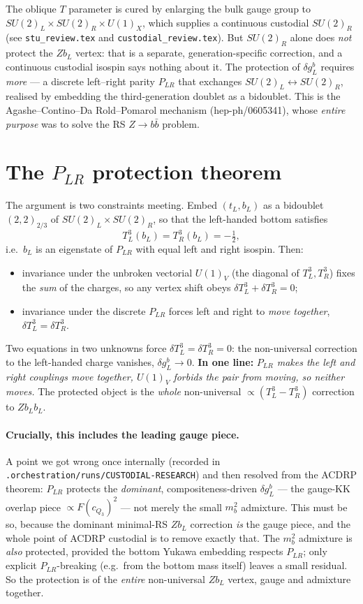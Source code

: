 \documentclass[11pt]{article}
\newcommand{\SUL}{SU(2)_L}
\newcommand{\SUR}{SU(2)_R}
\newcommand{\UX}{U(1)_X}
\newcommand{\PLR}{P_{LR}}
\newcommand{\code}[1]{\texttt{#1}}
\newcommand{\dgL}{\delta g_L^b}
\theoremstyle{definition}
\begin{document}
The oblique $T$ parameter is cured by enlarging the bulk gauge group to
$\SUL\times\SUR\times\UX$, which supplies a continuous custodial $\SUR$
(see \code{stu\_review.tex} and \code{custodial\_review.tex}). But $\SUR$ alone
does \emph{not} protect the $Zb_L$ vertex: that is a separate, generation-specific
correction, and a continuous custodial isospin says nothing about it. The
protection of $\dgL$ requires \emph{more} --- a discrete left--right parity
$\PLR$ that exchanges $\SUL\leftrightarrow\SUR$, realised by embedding the
third-generation doublet as a bidoublet. This is the Agashe--Contino--Da
Rold--Pomarol mechanism (hep-ph/0605341), whose \emph{entire purpose} was to
solve the RS $Z\to b\bar b$ problem.

\section{The $\PLR$ protection theorem}
\label{sec:plr}

The argument is two constraints meeting. Embed $(t_L, b_L)$ as a bidoublet
$(2,2)_{2/3}$ of $\SUL\times\SUR$, so that the left-handed bottom satisfies
\begin{equation}
T^3_L(b_L) = T^3_R(b_L) = -\tfrac12,
\end{equation}
i.e.\ $b_L$ is an eigenstate of $\PLR$ with equal left and right isospin. Then:
\begin{itemize}[leftmargin=1.4em]
\item invariance under the unbroken vectorial $U(1)_V$ (the diagonal of
$T^3_L,T^3_R$) fixes the \emph{sum} of the charges, so any vertex shift obeys
$\delta T^3_L + \delta T^3_R = 0$;
\item invariance under the discrete $\PLR$ forces left and right to \emph{move
together}, $\delta T^3_L = \delta T^3_R$.
\end{itemize}
Two equations in two unknowns force $\delta T^3_L = \delta T^3_R = 0$: the
non-universal correction to the left-handed charge vanishes,
$\dgL\to 0$. \textbf{In one line:} \emph{$\PLR$ makes the left and right
couplings move together, $U(1)_V$ forbids the pair from moving, so neither
moves.} The protected object is the \emph{whole} non-universal $\propto
(T^3_L - T^3_R)$ correction to $Zb_Lb_L$.

\paragraph{Crucially, this includes the leading gauge piece.} A point we got
wrong once internally (recorded in \code{.orchestration/runs/CUSTODIAL-RESEARCH})
and then resolved from the ACDRP theorem: $\PLR$ protects the
\emph{dominant}, compositeness-driven $\dgL$ --- the gauge-KK overlap piece
$\propto F(c_{Q_3})^2$ --- not merely the small $m_b^2$ admixture. This must be
so, because the dominant minimal-RS $Zb_L$ correction \emph{is} the gauge piece,
and the whole point of ACDRP custodial is to remove exactly that. The $m_b^2$
admixture is \emph{also} protected, provided the bottom Yukawa embedding respects
$\PLR$; only explicit $\PLR$-breaking (e.g.\ from the bottom mass itself) leaves
a small residual. So the protection is of the \emph{entire} non-universal
$Zb_L$ vertex, gauge and admixture together.
\end{document}
